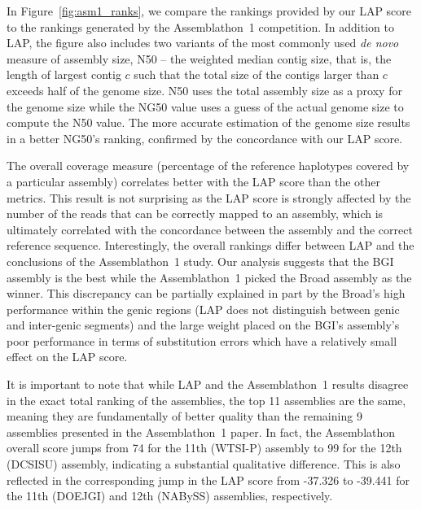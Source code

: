 In Figure~\ref{fig:asm1_ranks}, we compare the rankings provided by our
LAP score to the rankings generated by the Assemblathon~1
competition. In addition to LAP, the figure also includes two variants
of the most commonly used \emph{de novo} measure of assembly size, N50
-- the weighted median contig size, that is, the length of largest contig $c$ such
that the total size of the contigs larger than $c$ exceeds half of the genome
size.  N50 uses the total assembly size as a proxy
for the genome size while the NG50 value uses a guess of the actual
genome size to compute the N50 value.  The more accurate estimation of the
genome size results in a better NG50's ranking, confirmed by the concordance with our LAP score.

The overall coverage measure (percentage of the reference haplotypes
covered by a particular assembly) correlates better with the LAP
score than the other metrics. This result is not surprising as the LAP score is strongly
affected by the number of the reads that can be correctly mapped to an
assembly, which is ultimately correlated with the concordance between
the assembly and the correct reference sequence.  Interestingly, the
overall rankings differ between LAP and the conclusions of the
Assemblathon~1 study.  Our analysis suggests that the BGI assembly is the best while the Assemblathon~1 picked the Broad
assembly as the winner.  This discrepancy can be partially explained in part by
the Broad's high performance within the genic regions (LAP does not
distinguish between genic and inter-genic segments) and the large
weight placed on the BGI's assembly's poor performance in terms of
substitution errors which have a relatively small effect on the LAP
score.

It is important to note that while LAP and the Assemblathon~1 results
disagree in the exact total ranking of the assemblies, the top 11 assemblies are
the same, meaning they are fundamentally of better quality than the
remaining 9 assemblies presented in the Assemblathon~1 paper.  In
fact, the Assemblathon overall score jumps from 74 for the 11th (WTSI-P)
assembly to 99 for the 12th (DCSISU) assembly, indicating a substantial qualitative
difference.  This is also reflected in the corresponding jump in the LAP score
from -37.326 to -39.441 for the 11th (DOEJGI) and 12th
(NABySS) assemblies, respectively.

